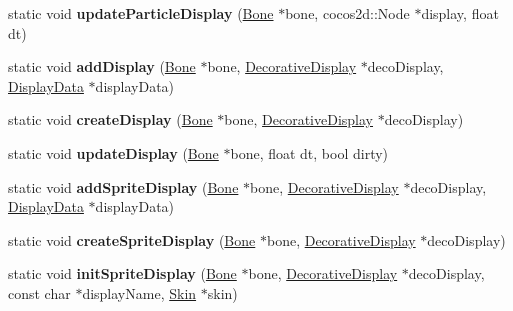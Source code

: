 \begin{DoxyCompactItemize}
static void {\bfseries update\+Particle\+Display} (\hyperlink{classcocostudio_1_1Bone}{Bone} $\ast$bone, cocos2d\+::\+Node $\ast$display, float dt)
\item 
\mbox{\label{classcocostudio_1_1DisplayFactory_a6cf802f3e54adaa21bf3b6abbcb7e2c3}} 
static void {\bfseries add\+Display} (\hyperlink{classcocostudio_1_1Bone}{Bone} $\ast$bone, \hyperlink{classcocostudio_1_1DecorativeDisplay}{Decorative\+Display} $\ast$deco\+Display, \hyperlink{classcocostudio_1_1DisplayData}{Display\+Data} $\ast$display\+Data)
\item 
\mbox{\label{classcocostudio_1_1DisplayFactory_abdb3c589815a610af97d653cc39c7206}} 
static void {\bfseries create\+Display} (\hyperlink{classcocostudio_1_1Bone}{Bone} $\ast$bone, \hyperlink{classcocostudio_1_1DecorativeDisplay}{Decorative\+Display} $\ast$deco\+Display)
\item 
\mbox{\label{classcocostudio_1_1DisplayFactory_ad947d036754c886401bc8214f4043f61}} 
static void {\bfseries update\+Display} (\hyperlink{classcocostudio_1_1Bone}{Bone} $\ast$bone, float dt, bool dirty)
\item 
\mbox{\label{classcocostudio_1_1DisplayFactory_a491a92a9a11ff94e71009b5582d36f76}} 
static void {\bfseries add\+Sprite\+Display} (\hyperlink{classcocostudio_1_1Bone}{Bone} $\ast$bone, \hyperlink{classcocostudio_1_1DecorativeDisplay}{Decorative\+Display} $\ast$deco\+Display, \hyperlink{classcocostudio_1_1DisplayData}{Display\+Data} $\ast$display\+Data)
\item 
\mbox{\label{classcocostudio_1_1DisplayFactory_a1c52681c6f99ee5edd2dcb485a49544a}} 
static void {\bfseries create\+Sprite\+Display} (\hyperlink{classcocostudio_1_1Bone}{Bone} $\ast$bone, \hyperlink{classcocostudio_1_1DecorativeDisplay}{Decorative\+Display} $\ast$deco\+Display)
\item 
\mbox{\label{classcocostudio_1_1DisplayFactory_aa4a304d030558522b3072e25d0a990e0}} 
static void {\bfseries init\+Sprite\+Display} (\hyperlink{classcocostudio_1_1Bone}{Bone} $\ast$bone, \hyperlink{classcocostudio_1_1DecorativeDisplay}{Decorative\+Display} $\ast$deco\+Display, const char $\ast$display\+Name, \hyperlink{classcocostudio_1_1Skin}{Skin} $\ast$skin)

\end{DoxyCompactItemize}

